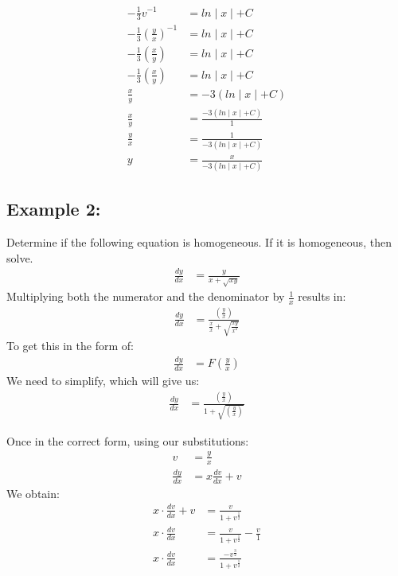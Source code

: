 \documentclass{article}
\begin{document}
\begin{flushleft}
{\begin{align*}
-\frac{1}{3}v^{-1} & = ln\mid x \mid + C \\
-\frac{1}{3}(\frac{y}{x})^{-1} & = ln\mid x \mid + C \\
-\frac{1}{3}(\frac{x}{y}) & = ln\mid x \mid + C \\
-\frac{1}{3}(\frac{x}{y}) & = ln\mid x \mid + C \\
\frac{x}{y} & = -3 (ln\mid x \mid + C) \\
\frac{x}{y} & = \frac{ -3 (ln\mid x \mid + C) }{1} \\
\frac{y}{x} & = \frac{1}{ -3 (ln\mid x \mid + C) } \\
y & =  \frac{x}{ -3 (ln\mid x \mid + C) } 
\end{align*}


\subsection*{\textbf{Example 2:}}
Determine if the following equation is homogeneous. If it is homogeneous, then solve.
\begin{align*}
\frac{dy}{dx} & = \frac{y}{x +\sqrt{xy}}
\end{align*}
\newpage
Multiplying both the numerator and the denominator by $\frac{1}{x}$ results in:\\
\begin{align*}
\frac{dy}{dx} & = \frac{(\frac{y}{x})}{\frac{x}{x} +\sqrt{\frac{xy}{x^2}}}
\end{align*}
To get this in the form of:
\begin{align*}
\frac{dy}{dx} & = F (\frac{y}{x})
\end{align*}
We need to simplify, which will give us:\\
\begin{align*}
\frac{dy}{dx} & = \frac{(\frac{y}{x})}{1 +\sqrt{(\frac{y}{x})}}
\end{align*}

Once in the correct form, using our substitutions:\\
\begin{align*}
v & = \frac{y}{x}\\
\frac{dy}{dx} & = x \frac{dv}{dx} + v
 \end{align*}
We obtain:\\
\begin{align*}
x \cdot \frac{dv}{dx} + v & = \frac{v}{1 + v^\frac{1}{2}}\\
x \cdot  \frac{dv}{dx}  & = \frac{v}{1 + v^\frac{1}{2}} - \frac{v}{1}\\
x \cdot  \frac{dv}{dx}  & = \frac{-v^\frac{3}{2}}{1 + v^\frac{1}{2}}
\end{align*}

}
\end{flushleft}
\end{document}
